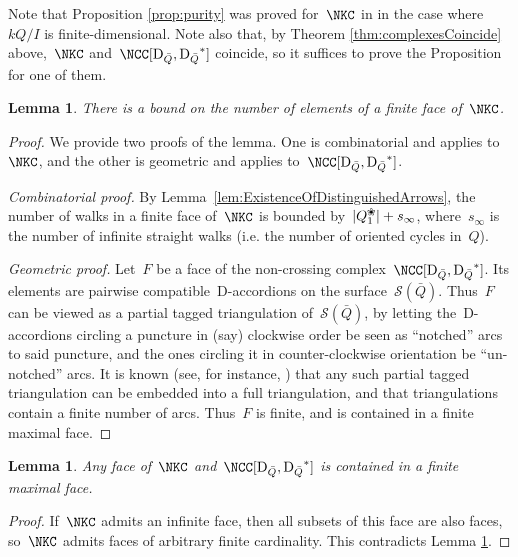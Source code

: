 \documentclass{amsart}
\newtheorem{lemma}[theorem]{Lemma}
\theoremstyle{definition}
\newcommand{\blossom}{^\text{\ding{96}}} %
\newcommand{\surface}{\mathcal{S}} %
\newcommand{\dual}{^*} %
\newcommand{\dissection}{\mathrm{D}} %
\begin{document}
Note that Proposition \ref{prop:purity} was proved for~$\NKC$ in \cite[Corollary 2.27]{PaluPilaudPlamondon} in the case where~$kQ/I$ is finite-dimensional.
Note also that, by Theorem \ref{thm:complexesCoincide} above,~$\NKC$ and~$\NCC[\dissection_{\bar Q}, {\dissection_{\bar Q}}\dual]$ coincide, so it suffices to prove the Proposition for one of them.


\begin{lemma}
\label{lemm:facesAreBounded}
There is a bound on the number of elements of a finite face of~$\NKC$.
\end{lemma}
\begin{proof}
 We provide two proofs of the lemma.
 One is combinatorial and applies to~$\NKC$, and the other is geometric and applies to~$\NCC[\dissection_{\bar Q}, {\dissection_{\bar Q}}\dual]$.
 
 {\it Combinatorial proof.} By Lemma~\ref{lem:ExistenceOfDistinguishedArrows}, the number of walks in a finite face of~$\NKC$ is bounded by~$|Q_1\blossom|+s_\infty$, where~$s_\infty$ is the number of infinite straight walks (i.e. the number of oriented cycles in~$Q$).

 {\it Geometric proof.} Let~$F$ be a face of the non-crossing complex~$\NCC[\dissection_{\bar Q}, {\dissection_{\bar Q}}\dual]$.
 Its elements are pairwise compatible~$\dissection$-accordions on the surface~$\surface(\bar Q)$.
 Thus~$F$ can be viewed as a partial tagged triangulation of~$\surface(\bar Q)$, by letting the~$\dissection$-accordions circling a puncture in (say) clockwise order be seen as ``notched'' arcs to said puncture, and the ones circling it in counter-clockwise orientation be ``un-notched'' arcs.
 It is known (see, for instance, \cite{FominShapiroThurston}) that any such partial tagged triangulation can be embedded into a full triangulation, and that triangulations contain a finite number of arcs.
 Thus~$F$ is finite, and is contained in a finite maximal face.
\end{proof}




\begin{lemma}
\label{lemm:facetsAreFinite}
Any face of~$\NKC$ and~$\NCC[\dissection_{\bar Q}, {\dissection_{\bar Q}}\dual]$ is contained in a finite maximal face.
\end{lemma}
\begin{proof}
 If~$\NKC$ admits an infinite face, then all subsets of this face are also faces, so~$\NKC$ admits faces of arbitrary finite cardinality.
 This contradicts Lemma \ref{lemm:facesAreBounded}.
\end{proof}
\end{document}
